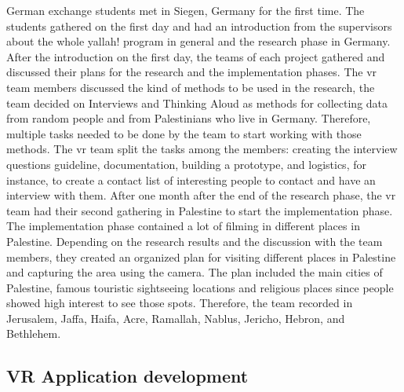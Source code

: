 German exchange students met in Siegen, Germany for the first time. The students gathered
on the first day and had an introduction from the supervisors about the whole \acrshort{yallah!}
program in general and the research phase in Germany. After the introduction on the first
day, the teams of each project gathered and discussed their plans for the research and the
implementation phases. The \acrshort{vr} team members discussed the kind of methods to be used in
the research, the team decided on Interviews and Thinking Aloud as methods for collecting
data from random people and from Palestinians who live in Germany. Therefore, multiple tasks needed to be done by the team to start working with those methods. The \acrshort{vr}
team split the tasks among the members: creating the interview questions guideline,
documentation, building a prototype, and logistics, for instance, to create a contact list of
interesting people to contact and have an interview with them.
After one month after the end of the research phase, the \acrshort{vr} team had their second gathering
in Palestine to start the implementation phase. The implementation phase contained a lot of
filming in different places in Palestine. Depending on the research results and the discussion
with the team members, they created an organized plan for visiting different places in
Palestine and capturing the area using the camera. The plan included the main cities of
Palestine, famous touristic sightseeing locations and religious places since people showed
high interest to see those spots. Therefore, the team recorded in Jerusalem, Jaffa, Haifa, Acre, Ramallah, Nablus, Jericho, Hebron, and Bethlehem.

\subsection{VR Application development}

